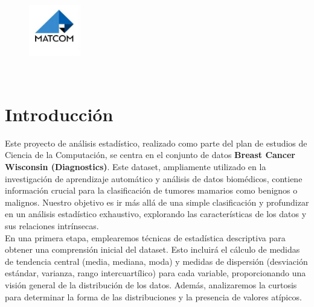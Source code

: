 \documentclass[a4paper, 12pt]{article}
\begin{document}
\graphicspath{{./}}

\begin{center}
\\
\vspace {0.5cm}
\\
\vspace {0.5cm}
\\
\vspace {5cm}
\\
\\
\vspace {1cm}
\vspace {2cm}
\\
\vspace {0.5cm}
\\
\\
\vspace {0.5cm}
\begin{figure}[h]
    \centering
    \includegraphics[width=0.2\textwidth, height=0.2\textheight]{MATCOM.jpg}
\end{figure}
\vspace {0.5cm}
\\


\end{center}

\newpage
\tableofcontents
\newpage

\section{Introducción}

 Este proyecto de análisis estadístico, realizado como parte del plan de estudios de Ciencia de la Computación, se centra en el conjunto de datos \textbf{Breast Cancer Wisconsin (Diagnostics)}. Este dataset, ampliamente utilizado en la investigación de aprendizaje automático y análisis de datos biomédicos, contiene información crucial para la clasificación de tumores mamarios como benignos o malignos. Nuestro objetivo es ir más allá de una simple clasificación y profundizar en un análisis estadístico exhaustivo, explorando las características de los datos y sus relaciones intrínsecas.\\

En una primera etapa, emplearemos técnicas de estadística descriptiva para obtener una comprensión inicial del dataset. Esto incluirá el cálculo de medidas de tendencia central (media, mediana, moda) y medidas de dispersión (desviación estándar, varianza, rango intercuartílico) para cada variable, proporcionando una visión general de la distribución de los datos. Además, analizaremos la curtosis para determinar la forma de las distribuciones y la presencia de valores atípicos.\\
\end{document}
